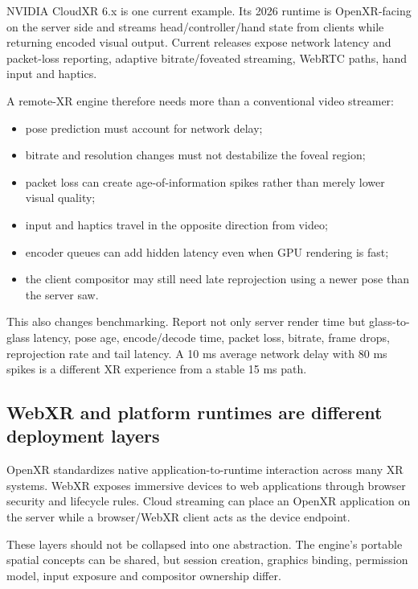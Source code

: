 NVIDIA CloudXR 6.x is one current example. Its 2026 runtime is OpenXR-facing on the server side and streams head/controller/hand state from clients while returning encoded visual output. Current releases expose network latency and packet-loss reporting, adaptive bitrate/foveated streaming, WebRTC paths, hand input and haptics.

A remote-XR engine therefore needs more than a conventional video streamer:

\begin{itemize}
\tightlist
\item
  pose prediction must account for network delay;
\item
  bitrate and resolution changes must not destabilize the foveal region;
\item
  packet loss can create age-of-information spikes rather than merely lower visual quality;
\item
  input and haptics travel in the opposite direction from video;
\item
  encoder queues can add hidden latency even when GPU rendering is fast;
\item
  the client compositor may still need late reprojection using a newer pose than the server saw.
\end{itemize}

This also changes benchmarking. Report not only server render time but glass-to-glass latency, pose age, encode/decode time, packet loss, bitrate, frame drops, reprojection rate and tail latency. A 10 ms average network delay with 80 ms spikes is a different XR experience from a stable 15 ms path.

\subsection{WebXR and platform runtimes are different deployment layers}\label{06-engine-ii-ch042-webxr-and-platform-runtimes-are-different-deployment-layers}

\hypertarget{06-engine-ii-ch042-webxr-and-platform-runtimes-are-different-deployment-layers}{}

OpenXR standardizes native application-to-runtime interaction across many XR systems. WebXR exposes immersive devices to web applications through browser security and lifecycle rules. Cloud streaming can place an OpenXR application on the server while a browser/WebXR client acts as the device endpoint.

These layers should not be collapsed into one abstraction. The engine's portable spatial concepts can be shared, but session creation, graphics binding, permission model, input exposure and compositor ownership differ.

